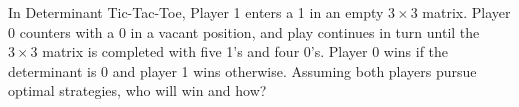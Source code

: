 In Determinant Tic-Tac-Toe, Player 1 enters a 1 in an empty
$3 \times 3$ matrix. Player 0 counters with a 0 in a vacant position,
and play continues in turn until the $3 \times 3$ matrix is
completed with five 1's and four 0's. Player 0 wins if the
determinant is 0 and player 1 wins otherwise. Assuming both
players pursue optimal strategies, who will win and how?
